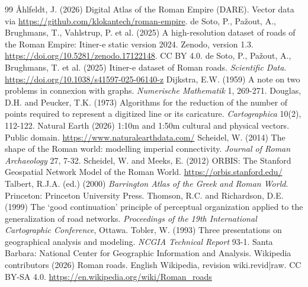 \documentclass[11pt,a4paper]{article}
\begin{document}
\begin{thebibliography}{99}
 {\AA}hlfeldt, J. (2026) Digital Atlas of the Roman Empire (DARE). Vector data via \url{https://github.com/klokantech/roman-empire}.
 de Soto, P., Pa\v{z}out, A., Brughmans, T., Vahlstrup, P. et al. (2025) A high-resolution dataset of roads of the Roman Empire: Itiner-e static version 2024. Zenodo, version 1.3. \url{https://doi.org/10.5281/zenodo.17122148}. CC BY 4.0.
 de Soto, P., Pa\v{z}out, A., Brughmans, T. et al. (2025) Itiner-e dataset of Roman roads. \emph{Scientific Data}. \url{https://doi.org/10.1038/s41597-025-06140-z}
 Dijkstra, E.W. (1959) A note on two problems in connexion with graphs. \emph{Numerische Mathematik} 1, 269-271.
 Douglas, D.H. and Peucker, T.K. (1973) Algorithms for the reduction of the number of points required to represent a digitized line or its caricature. \emph{Cartographica} 10(2), 112-122.
 Natural Earth (2026) 1:10m and 1:50m cultural and physical vectors. Public domain. \url{https://www.naturalearthdata.com/}
 Scheidel, W. (2014) The shape of the Roman world: modelling imperial connectivity. \emph{Journal of Roman Archaeology} 27, 7-32.
 Scheidel, W. and Meeks, E. (2012) ORBIS: The Stanford Geospatial Network Model of the Roman World. \url{https://orbis.stanford.edu/}
 Talbert, R.J.A. (ed.) (2000) \emph{Barrington Atlas of the Greek and Roman World}. Princeton: Princeton University Press.
 Thomson, R.C. and Richardson, D.E. (1999) The `good continuation' principle of perceptual organization applied to the generalization of road networks. \emph{Proceedings of the 19th International Cartographic Conference}, Ottawa.
 Tobler, W. (1993) Three presentations on geographical analysis and modeling. \emph{NCGIA Technical Report} 93-1. Santa Barbara: National Center for Geographic Information and Analysis.
 Wikipedia contributors (2026) Roman roads. English Wikipedia, revision {{wiki.revid|raw}}. CC BY-SA 4.0. \url{https://en.wikipedia.org/wiki/Roman_roads}
\end{thebibliography}
\end{document}
